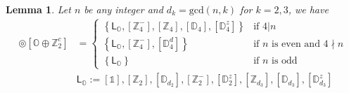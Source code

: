 \documentclass[11pt,a4paper]{amsart}
\newtheorem{lem}[thm]{Lemma}
\theoremstyle{definition}
\newcommand{\ZZ}{\mathbb{Z}}                %
\newcommand{\octa}{\mathbb{O}}              %
\newcommand{\DD}{\mathbb{D}}                %
\newcommand{\1}{\mathds{1}}		            %
\newcommand{\set}[1]{\left\{#1\right\}}     %
\begin{document}
\begin{lem}
Let $n$ be any integer and $d_k=\text{gcd}(n,k)$ for $k=2,3$, we have
	\begin{align*}
    [\DD_{2n}^{d}] \circledcirc [\octa \oplus \ZZ_2^c] 
               & =
    \begin{cases}
      \set{\mathsf{L}_{\octa},[\ZZ_4^-],[\ZZ_4],[\DD_4],[\DD_4^z]} & \text{if $4|n$}                      \\
      \set{\mathsf{L}_{\octa},[\ZZ_4^-],[\DD_4^d]}       & \text{if $n$ is even and $4\nmid n$} \\
      \set{\mathsf{L}_{\octa}}                                   & \text{if $n$ is odd}
    \end{cases}                                                                                                                                                  \\
               & \mathsf{L}_{\octa}:=[\1],[\ZZ_2],[\DD_{d_2}],[\ZZ_2^-],[\DD_2^z],[\ZZ_{d_3}],[\DD_{d_3}],[\DD_{d_3}^z]                                         
    \end{align*}
 \end{lem}
\end{document}
